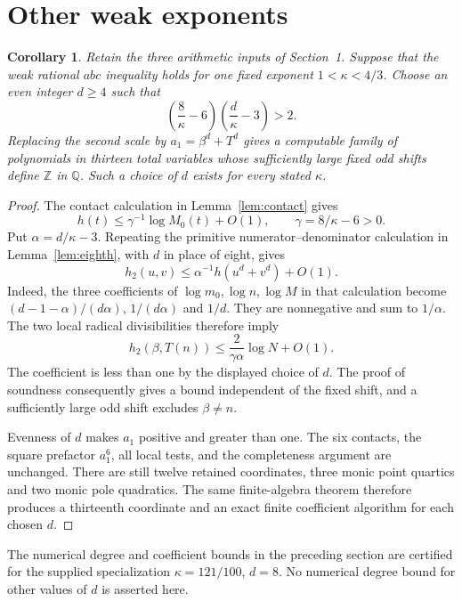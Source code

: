 \documentclass[11pt,a4paper]{article}
\newtheorem{corollary}[theorem]{Corollary}
\newcommand{\Q}{\mathbb Q}\newcommand{\Z}{\mathbb Z}
\begin{document}
\section{Other weak exponents}

\begin{corollary}\label{cor:general-exponent}
Retain the three arithmetic inputs of Section~1. Suppose that the
weak rational $abc$ inequality holds for one fixed exponent
$1<\kappa<4/3$. Choose an even integer $d\ge4$ such that
\[
 \left(\frac8\kappa-6\right)
       \left(\frac d\kappa-3\right)>2.
\]
Replacing the second scale by $a_1=\beta^d+T^d$ gives a
computable family of polynomials in thirteen total variables whose
sufficiently large fixed odd shifts define $\Z$ in $\Q$.
Such a choice of $d$ exists for every stated $\kappa$.
\end{corollary}
\begin{proof}
The contact calculation in Lemma~\ref{lem:contact} gives
\[
 h(t)\le\gamma^{-1}\log M_0(t)+O(1),
 \qquad \gamma=8/\kappa-6>0.
\]
Put $\alpha=d/\kappa-3$. Repeating the primitive
numerator--denominator calculation in Lemma~\ref{lem:eighth},
with $d$ in place of eight, gives
\[
 h_2(u,v)\le\alpha^{-1}h(u^d+v^d)+O(1).
\]
Indeed, the three coefficients of $\log m_0,\log n,\log M$
in that calculation become
$(d-1-\alpha)/(d\alpha)$, $1/(d\alpha)$ and $1/d$.
They are nonnegative and sum to $1/\alpha$.
The two local radical divisibilities therefore imply
\[
 h_2(\beta,T(n))\le\frac{2}{\gamma\alpha}\log N+O(1).
\]
The coefficient is less than one by the displayed choice of $d$.
The proof of soundness consequently gives a bound independent of
the fixed shift, and a sufficiently large odd shift excludes
$\beta\ne n$.

Evenness of $d$ makes $a_1$ positive and greater than one.
The six contacts, the square prefactor $a_1^6$, all local tests,
and the completeness argument are unchanged. There are still
twelve retained coordinates, three monic point quartics and two
monic pole quadratics. The same finite-algebra theorem therefore
produces a thirteenth coordinate and an exact finite coefficient
algorithm for each chosen $d$.
\end{proof}

The numerical degree and coefficient bounds in the preceding section
are certified for the supplied specialization $\kappa=121/100$, $d=8$.
No numerical degree bound for other values of $d$ is asserted here.
\end{document}
